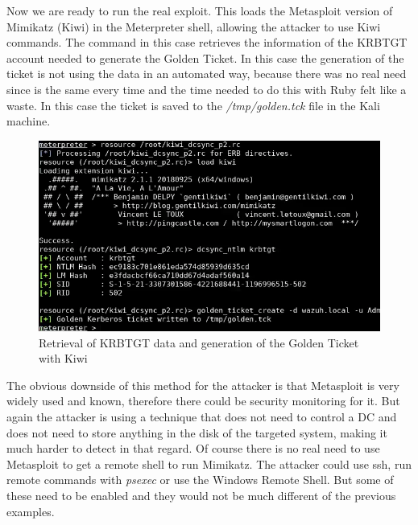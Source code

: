\linej
Now we are ready to run the real exploit. This loads the Metasploit version of Mimikatz (Kiwi) in the Meterpreter shell, allowing the attacker to use Kiwi commands.
The command in this case retrieves the information of the KRBTGT account needed to generate the Golden Ticket.
\linej
In this case the generation of the ticket is not using the data in an automated way, because there was no real need since is the same every time and the time needed to do this with Ruby felt like a waste. In this case the ticket is saved to the \textit{/tmp/golden.tck} file in the Kali machine.
\linej

\begin{figure}[H]
	\centering
	\includegraphics[width=\textwidth]{figuras/kiwi_p2.png}
	\caption{Retrieval of KRBTGT data and generation of the Golden Ticket with Kiwi}
\end{figure}
\linej
The obvious downside of this method for the attacker is that Metasploit is very widely used and known, therefore there could be security monitoring for it\cite{detect_metasploit_traffic}. But again the attacker is using a technique that does not need to control a DC and does not need to store anything in the disk of the targeted system, making it much harder to detect in that regard.
\linej
\linej
Of course there is no real need to use Metasploit to get a remote shell to run Mimikatz. The attacker could use ssh, run remote commands with \textit{psexec} or use the Windows Remote Shell. But some of these need to be enabled and they would not be much different of the previous examples.

